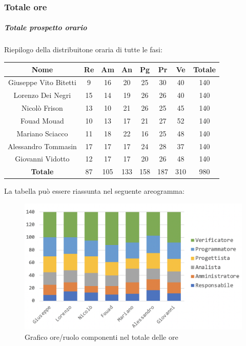 			\subsubsection{Totale ore}
			\subparagraph{Totale prospetto orario }
			Riepilogo della distribuitone oraria di tutte le fasi:
			\begin{longtable}{|c|c|c|c|c|c|c|c}
				\hline
				\rowcolor{lighter-grayer}
				\textbf{Nome} & \textbf{Re} & \textbf{Am} & \textbf{An} & \textbf{Pg}  & \textbf{Pr}   & \textbf{Ve} & \textbf{Totale} \\
				\hline
				\endfirsthead
				
				\hline
				Giuseppe Vito Bitetti 		& 9 & 16 & 20 & 25 & 30 & 40 & 140\\
				\hline
				\hline
				Lorenzo Dei Negri			& 15 & 14 & 19 & 26 & 26 & 40 & 140\\
				\hline
				\hline
				Nicolò Frison				    & 13 & 10 & 21 &26 & 25 & 45 & 140\\
				\hline
				\hline
				Fouad Mouad 				 & 10 & 13 & 17 & 21 & 27 & 52 & 140\\
				\hline
				\hline
				Mariano Sciacco 			& 11 & 18 & 22 & 16 & 25 & 48 & 140\\
				\hline
				\hline
				Alessandro Tommasin    & 17 & 17 & 17 & 24 & 28 & 37 & 140\\
				\hline
				\hline
				Giovanni Vidotto 			 & 12 & 17 & 17 & 20 & 26 & 48 & 140\\
				\hline 
				\textbf{Totale}				 & 87 & 105 & 133 & 158 & 187 & 310 & 980\\
				\hline
			\end{longtable}
			\pagebreak
			
			La tabella può essere riassunta nel seguente areogramma:
			\begin{figure}[H]
				\centering
				\includegraphics[width=0.8\linewidth]{./images/totOre1.png}
				\caption{Grafico ore/ruolo componenti nel totale delle ore}
				\label{fig:grafico suddivione ruoli totale ore}
			\end{figure}
			
